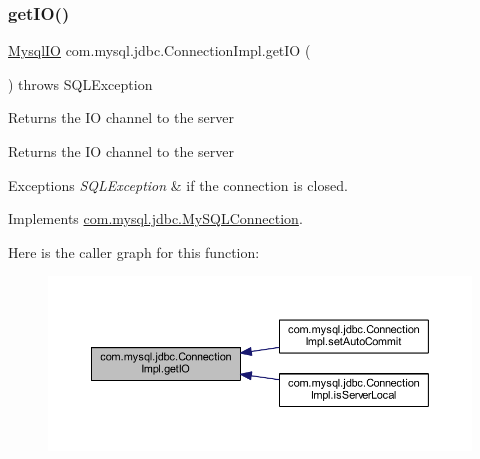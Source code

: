 \subsubsection{\texorpdfstring{get\+I\+O()}{getIO()}}
{\footnotesize\ttfamily \mbox{\hyperlink{classcom_1_1mysql_1_1jdbc_1_1_mysql_i_o}{Mysql\+IO}} com.\+mysql.\+jdbc.\+Connection\+Impl.\+get\+IO (\begin{DoxyParamCaption}{ }\end{DoxyParamCaption}) throws S\+Q\+L\+Exception}

Returns the IO channel to the server

\begin{DoxyReturn}{Returns}
the IO channel to the server 
\end{DoxyReturn}

\begin{DoxyExceptions}{Exceptions}
{\em S\+Q\+L\+Exception} & if the connection is closed. \\
\hline
\end{DoxyExceptions}


Implements \mbox{\hyperlink{interfacecom_1_1mysql_1_1jdbc_1_1_my_s_q_l_connection}{com.\+mysql.\+jdbc.\+My\+S\+Q\+L\+Connection}}.

Here is the caller graph for this function\+:\nopagebreak
\begin{figure}[H]
\begin{center}
\leavevmode
\includegraphics[width=350pt]{classcom_1_1mysql_1_1jdbc_1_1_connection_impl_a4d22c7c85c9da8bc9ee56bd4e0ede41d_icgraph}
\end{center}
\end{figure}
\mbox{\label{classcom_1_1mysql_1_1jdbc_1_1_connection_impl_ae9ce7aa6699cd62451e72acd02f46a42}} 
